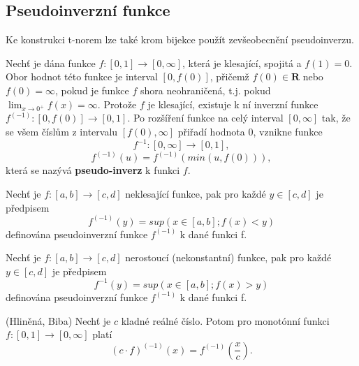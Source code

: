 \subsection{Pseudoinverzn\'i funkce}

Ke konstrukci t-norem lze také krom bijekce použít zevšeobecnění pseudoinverzu.
\begin{example}
    \cite{Kolo}
    Nech\v t je dána funkce $f:[0,1]\rightarrow [0,\infty]$, která je klesající, spojitá a $f(1) = 0.$ Obor hodnot této funkce je interval $[0,f(0)]$, přičemž $f(0) \in \textbf{R}$ nebo $f(0) = \infty$, pokud je funkce $f$ shora neohraničená, t.j. pokud $\lim_{x \to 0^+}f(x) = \infty$. Protože $f$ je klesající, existuje k ní inverzní funkce $f^{(-1)}: [0,f(0)] \rightarrow [0,1].$ Po rozšíření funkce na celý interval $[0,\infty]$ tak, že se všem čísl\r um z intervalu $[f(0),\infty]$ přiřadí hodnota 0, vznikne funkce $$f^{-1}: [0,\infty] \rightarrow [0,1],$$
    $$f^{(-1)}(u) = f^{(-1)}(min(u,f(0))),$$
    která se nazývá \textbf{pseudo-inverz} k funkci $f.$
\end{example}
\begin{definition}
    \cite{hlinena}
    Nech\v t je $f:[a,b] \rightarrow [c,d]$ neklesající funkce, pak pro každé $y \in [c,d]$ je předpisem $$f^{(-1)}(y) = sup(x \in [a,b];f(x)<y)$$
    definována pseudoinverzní funkce $f^{(-1)}$ k dané funkci f.
\end{definition}
\begin{definition}
    \cite{hlinena}
    Nech\v t je $f:[a,b] \rightarrow [c,d]$ nerostoucí (nekonstantní) funkce, pak pro každé $y \in [c,d]$ je předpisem $$f^{-1}(y) = sup(x \in [a,b];f(x)>y)$$
    definována pseudoinverzní funkce $f^{(-1)}$ k dané funkci f.
\end{definition}
\begin{sentence} (Hliněná, Biba)
    Nech\v t je $c$ kladné reálné číslo. Potom pro monot\'onní funkci $f:[0,1]\rightarrow
    [0,\infty]$ plat\'i
    $$\left (c\cdot f \right )^{(-1)}(x) = f^{(-1)}\left (\frac {x}{c} \right
    ).$$
\end{sentence}


